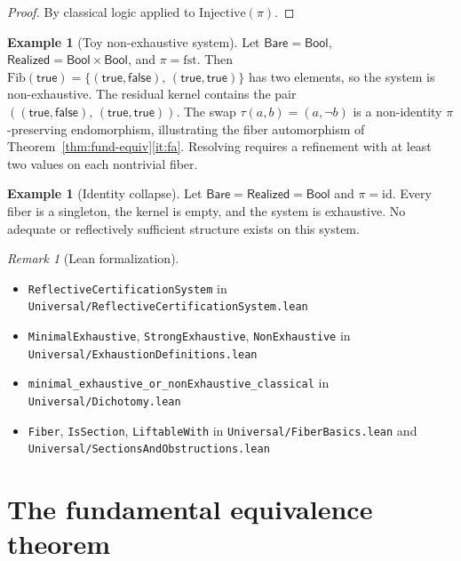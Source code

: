 \documentclass[11pt,a4paper]{article}
\theoremstyle{plain}
\theoremstyle{definition}
\newtheorem{example}[theorem]{Example}
\theoremstyle{remark}
\newtheorem{remark}[theorem]{Remark}
\newcommand{\Bare}{\mathsf{Bare}}
\newcommand{\Real}{\mathsf{Realized}}
\newcommand{\compare}{\pi}
\newcommand{\Fib}{\mathrm{Fib}}
\begin{document}
\begin{proof}
By classical logic applied to $\mathrm{Injective}(\compare)$.
\end{proof}

\begin{example}[Toy non-exhaustive system]\label{ex:toy}
Let $\Bare = \mathsf{Bool}$, $\Real = \mathsf{Bool} \times \mathsf{Bool}$,
and $\compare = \mathrm{fst}$. Then
$\Fib(\mathsf{true}) = \{(\mathsf{true}, \mathsf{false}),\,
(\mathsf{true}, \mathsf{true})\}$ has two elements, so the system is
non-exhaustive. The residual kernel contains the pair
$((\mathsf{true}, \mathsf{false}),\, (\mathsf{true}, \mathsf{true}))$.
The swap $\tau(a,b) = (a, \lnot b)$ is a non-identity $\compare$-preserving
endomorphism, illustrating the fiber automorphism of
Theorem~\ref{thm:fund-equiv}\ref{it:fa}. Resolving requires a refinement
with at least two values on each nontrivial fiber.
\end{example}

\begin{example}[Identity collapse]\label{ex:identity}
Let $\Bare = \Real = \mathsf{Bool}$ and $\compare = \mathrm{id}$. Every
fiber is a singleton, the kernel is empty, and the system is exhaustive.
No adequate or reflectively sufficient structure exists on this system.
\end{example}

\begin{remark}[Lean formalization]\label{rem:lean-rcs}
\leavevmode\par\begin{itemize}[nosep,leftmargin=*,before=\raggedright]
\item \texttt{ReflectiveCertificationSystem} in \texttt{Universal/ReflectiveCertificationSystem.lean}
\item \texttt{MinimalExhaustive}, \texttt{StrongExhaustive}, \texttt{NonExhaustive} in \texttt{Universal/\allowbreak{}ExhaustionDefinitions.lean}
\item \texttt{minimal\_exhaustive\_or\_\allowbreak{}nonExhaustive\_classical} in \texttt{Universal/Dichotomy.lean}
\item \texttt{Fiber}, \texttt{IsSection}, \texttt{LiftableWith} in \texttt{Universal/FiberBasics.lean} and \texttt{Universal/SectionsAndObstructions.lean}
\end{itemize}
\end{remark}

\section{The fundamental equivalence theorem}\label{sec:fund-equiv}
\end{document}

